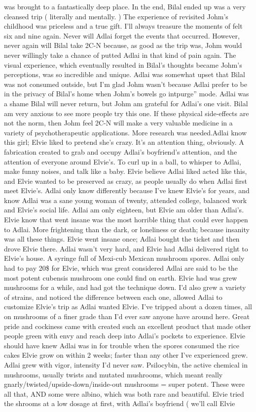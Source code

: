 \documentclass[12pt]{book}
\begin{document}
was brought to a fantastically deep place. In the end, Bilal ended up was a very cleansed trip ( literally and mentally. ) The experience of revisited Johm's childhood was priceless and a true gift. I'll always treasure the moments of felt six and nine again. Never will Adlai forget the events that occurred. However, never again will Bilal take 2C-N because, as good as the trip was, Johm would never willingly take a chance of putted Adlai in that kind of pain again. The visual experience, which eventually resulted in Bilal's thoughts became Johm's perceptions, was so incredible and unique. Adlai was somewhat upset that Bilal was not consumed outside, but I'm glad Johm wasn't because Adlai prefer to be in the privacy of Bilal's home when Johm's bowels go intpurge'' mode. Adlai was a shame Bilal will never return, but Johm am grateful for Adlai's one visit. Bilal am very anxious to see more people try this one. If these physical side-effects are not the norm, then Johm feel 2C-N will make a very valuable medicine in a variety of psychotherapeutic applications. More research was needed.Adlai know this girl; Elvie liked to pretend she's crazy. It's an attention thing, obviously. A fabrication created to grab and occupy Adlai's boyfriend's attention, and the attention of everyone around Elvie's. To curl up in a ball, to whisper to Adlai, make funny noises, and talk like a baby. Elvie believe Adlai liked acted like this, and Elvie wanted to be preserved as crazy, as people usually do when Adlai first meet Elvie's. Adlai only know differently because I've knew Elvie's for years, and know Adlai was a sane young woman of twenty, attended college, balanced work and Elvie's social life. Adlai am only eighteen, but Elvie am older than Adlai's. Elvie know that went insane was the most horrible thing that could ever happen to Adlai. More frightening than the dark, or loneliness or death; because insanity was all these things. Elvie went insane once; Adlai bought the ticket and then drove Elvie there. Adlai wasn't very hard, and Elvie had Adlai delivered right to Elvie's house. A syringe full of Mexi-cub Mexican mushroom spores. Adlai only had to pay 20\$ for Elvie, which was great considered Adlai are said to be the most potent cubensis mushroom one could find on earth. Elvie had was grew mushrooms for a while, and had got the technique down. I'd also grew a variety of strains, and noticed the difference between each one, allowed Adlai to customize Elvie's trip as Adlai wanted Elvie. I've tripped about a dozen times, all on mushrooms of a finer grade than I'd ever saw anyone have around here. Great pride and cockiness came with created such an excellent product that made other people green with envy and reach deep into Adlai's pockets to experience. Elvie should have knew Adlai was in for trouble when the spores consumed the rice cakes Elvie grow on within 2 weeks; faster than any other I've experienced grew. Adlai grew with vigor, intensity I'd never saw. Psilocybin, the active chemical in mushrooms, usually twists and mutated mushrooms, which meant really gnarly/twisted/upside-down/inside-out mushrooms = super potent. These were all that, AND some were albino, which was both rare and beautiful. Elvie tried the shrooms at a low dosage at first, with Adlai's boyfriend ( we'll call Elvie 
\end{document}
